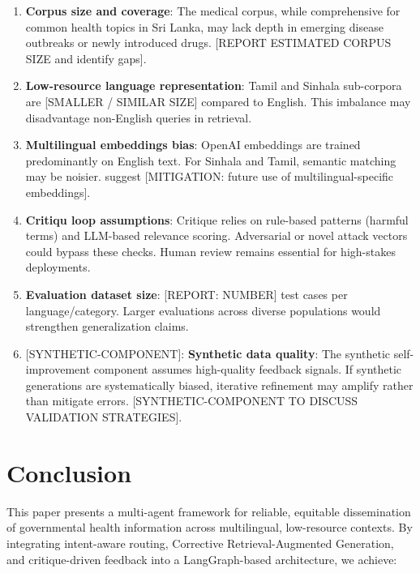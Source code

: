 \documentclass[11pt,a4paper]{article}
\newcommand{\synthetic}[1]{{\colorbox{syntheticcolor}{[SYNTHETIC-COMPONENT]: #1}}}
\begin{document}
\begin{enumerate}
    \item \textbf{Corpus size and coverage}: The medical corpus, while comprehensive for common health topics in Sri Lanka, may lack depth in emerging disease outbreaks or newly introduced drugs. [REPORT ESTIMATED CORPUS SIZE and identify gaps].
    
    \item \textbf{Low-resource language representation}: Tamil and Sinhala sub-corpora are [SMALLER / SIMILAR SIZE] compared to English. This imbalance may disadvantage non-English queries in retrieval.
    
    \item \textbf{Multilingual embeddings bias}: OpenAI embeddings are trained predominantly on English text. For Sinhala and Tamil, semantic matching may be noisier. \cite{multilingual-embeddings} suggest [MITIGATION: future use of multilingual-specific embeddings].
    
    \item \textbf{Critiqu loop assumptions}: Critique relies on rule-based patterns (harmful terms) and LLM-based relevance scoring. Adversarial or novel attack vectors could bypass these checks. Human review remains essential for high-stakes deployments.
    
    \item \textbf{Evaluation dataset size}: [REPORT: NUMBER] test cases per language/category. Larger evaluations across diverse populations would strengthen generalization claims.
    
    \item \synthetic{
        \textbf{Synthetic data quality}: The synthetic self-improvement component assumes high-quality feedback signals. If synthetic generations are systematically biased, iterative refinement may amplify rather than mitigate errors. [SYNTHETIC-COMPONENT TO DISCUSS VALIDATION STRATEGIES].
    }
\end{enumerate}

\section{Conclusion}

This paper presents a multi-agent framework for reliable, equitable dissemination of governmental health information across multilingual, low-resource contexts. By integrating intent-aware routing, Corrective Retrieval-Augmented Generation, and critique-driven feedback into a LangGraph-based architecture, we achieve:
\end{document}
